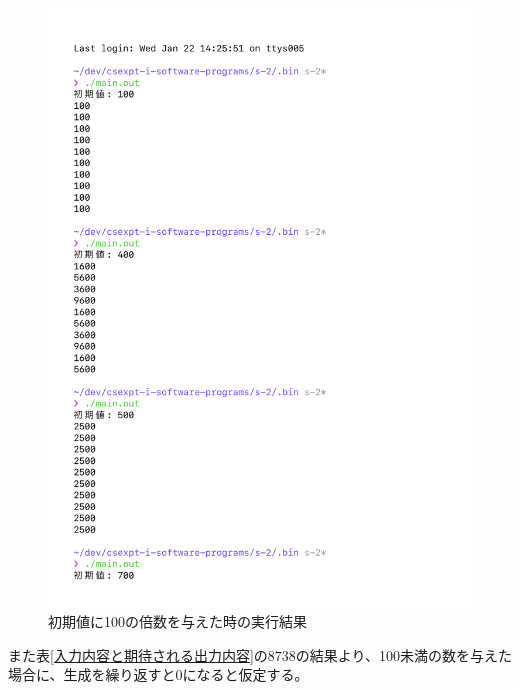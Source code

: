 \begin{figure}[H]
    \ContinuedFloat
    \centering
    \includegraphics[width=0.8\hsize, pagebox=mediabox, page=3]{main_result2.pdf}
    \caption{初期値に100の倍数を与えた時の実行結果}
    \label{初期値に100の倍数を与えた時の実行結果}
\end{figure}

また表\ref{入力内容と期待される出力内容}の$8738$の結果より、100未満の数を与えた場合に、生成を繰り返すと$0$になると仮定する。

